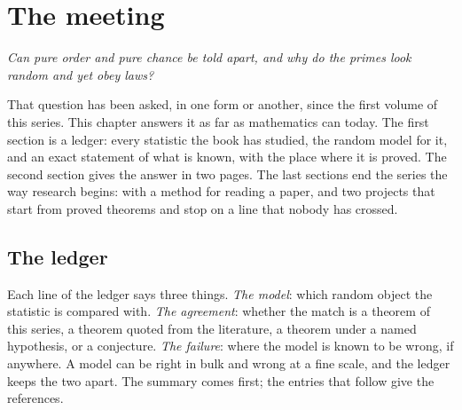\chapter{The meeting}\label{ch:meeting}

\begin{center}\itshape
Can pure order and pure chance be told apart, and why do the primes look random and yet obey laws?
\end{center}

That question has been asked, in one form or another, since the first volume of this series. This chapter answers it as far as mathematics can today. The first section is a ledger: every statistic the book has studied, the random model for it, and an exact statement of what is known, with the place where it is proved. The second section gives the answer in two pages. The last sections end the series the way research begins: with a method for reading a paper, and two projects that start from proved theorems and stop on a line that nobody has crossed.

\section{The ledger}\label{sec:ledger}

Each line of the ledger says three things. \emph{The model}: which random object the statistic is compared with. \emph{The agreement}: whether the match is a theorem of this series, a theorem quoted from the literature, a theorem under a named hypothesis, or a conjecture. \emph{The failure}: where the model is known to be wrong, if anywhere. A model can be right in bulk and wrong at a fine scale, and the ledger keeps the two apart. The summary comes first; the entries that follow give the references.

